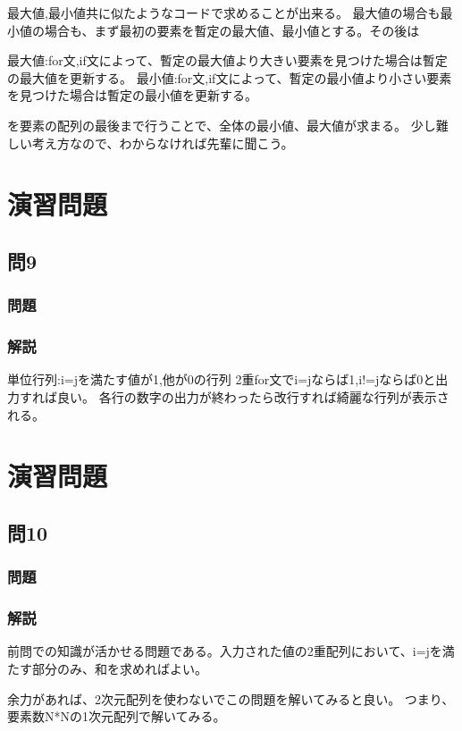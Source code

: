 最大値,最小値共に似たようなコードで求めることが出来る。
最大値の場合も最小値の場合も、まず最初の要素を暫定の最大値、最小値とする。その後は

最大値:for文,if文によって、暫定の最大値より大きい要素を見つけた場合は暫定の最大値を更新する。
最小値:for文,if文によって、暫定の最小値より小さい要素を見つけた場合は暫定の最小値を更新する。

を要素の配列の最後まで行うことで、全体の最小値、最大値が求まる。
少し難しい考え方なので、わからなければ先輩に聞こう。


\section{演習問題}
\subsection{問9}
\subsubsection{問題}

\subsubsection{解説}

単位行列:i=jを満たす値が1,他が0の行列
2重for文でi=jならば1,i!=jならば0と出力すれば良い。
各行の数字の出力が終わったら改行すれば綺麗な行列が表示される。

\section{演習問題}
\subsection{問10}
\subsubsection{問題}

\subsubsection{解説}

前問での知識が活かせる問題である。入力された値の2重配列において、i=jを満たす部分のみ、和を求めればよい。

余力があれば、2次元配列を使わないでこの問題を解いてみると良い。
つまり、要素数N*Nの1次元配列で解いてみる。

